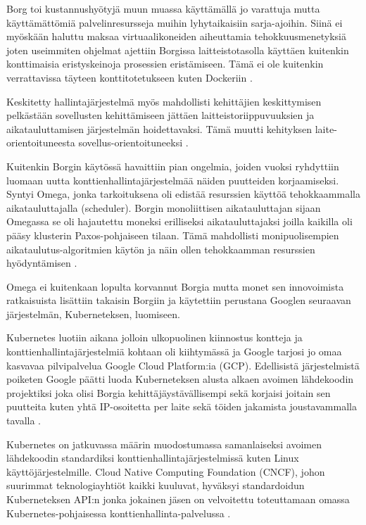 \documentclass[finnish,gradu]{tktltiki3}
\begin{document}
Borg toi kustannushyötyjä muun muassa käyttämällä jo varattuja mutta käyttämättömiä palvelinresursseja muihin lyhytaikaisiin sarja-ajoihin. Siinä ei myöskään haluttu maksaa virtuaalikoneiden aiheuttamia tehokkuusmenetyksiä joten useimmiten ohjelmat ajettiin Borgissa laitteistotasolla käyttäen kuitenkin konttimaisia eristyskeinoja prosessien eristämiseen. Tämä ei ole kuitenkin verrattavissa täyteen konttitotetukseen kuten Dockeriin \cite{management-with-borg}.

Keskitetty hallintajärjestelmä myös mahdollisti kehittäjien keskittymisen pelkästään sovellusten kehittämiseen jättäen laitteistoriippuvuuksien ja aikatauluttamisen järjestelmän hoidettavaksi. Tämä muutti kehityksen laite-orientoituneesta sovellus-orientoituneeksi \cite{borg-omega-kubernetes}.

Kuitenkin Borgin käytössä havaittiin pian ongelmia, joiden vuoksi ryhdyttiin luomaan uutta konttienhallintajärjestelmää näiden puutteiden korjaamiseksi. Syntyi Omega, jonka tarkoituksena oli edistää resurssien käyttöä tehokkaammalla aikatauluttajalla (scheduler). Borgin monoliittisen aikatauluttajan sijaan Omegassa se oli hajautettu moneksi erilliseksi aikatauluttajaksi joilla kaikilla oli pääsy klusterin Paxos-pohjaiseen tilaan. Tämä mahdollisti monipuolisempien aikataulutus-algoritmien käytön ja näin ollen tehokkaamman resurssien hyödyntämisen \cite{omega}.

Omega ei kuitenkaan lopulta korvannut Borgia mutta monet sen innovoimista ratkaisuista lisättiin takaisin Borgiin ja käytettiin perustana Googlen seuraavan järjestelmän, Kuberneteksen, luomiseen.

Kubernetes luotiin aikana jolloin ulkopuolinen kiinnostus kontteja ja konttienhallintajärjestelmiä kohtaan oli kiihtymässä ja Google tarjosi jo omaa kasvavaa pilvipalvelua Google Cloud Platform:ia (GCP). Edellisistä järjestelmistä poiketen Google päätti luoda Kuberneteksen alusta alkaen avoimen lähdekoodin projektiksi joka olisi Borgia kehittäjäystävällisempi sekä korjaisi joitain sen puutteita kuten yhtä IP-osoitetta per laite sekä töiden jakamista joustavammalla tavalla \cite{borg-omega-kubernetes}.

Kubernetes on jatkuvassa määrin muodostumassa samanlaiseksi avoimen lähdekoodin standardiksi konttienhallintajärjestelmissä kuten Linux käyttöjärjestelmille. Cloud Native Computing Foundation (CNCF), johon suurimmat teknologiayhtiöt kaikki kuuluvat, hyväksyi standardoidun Kuberneteksen API:n jonka jokainen jäsen on velvoitettu toteuttamaan omassa Kubernetes-pohjaisessa konttienhallinta-palvelussa \cite{kubernetes-cncf-standard-announcement}.
\end{document}
